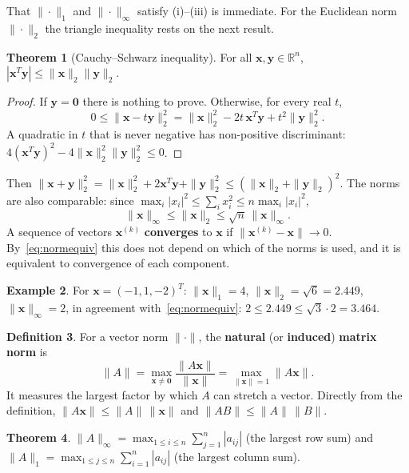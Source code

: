 \documentclass[11pt,a4paper]{article}
\numberwithin{equation}{section}
\theoremstyle{definition}
\newtheorem{thm}{Theorem}[subsection]
\newtheorem{defn}[thm]{Definition}
\newtheorem{exa}[thm]{Example}
\begin{document}
That $\|\cdot\|_1$ and $\|\cdot\|_\infty$ satisfy (i)--(iii) is immediate. For the Euclidean norm $\|\cdot\|_2$ the triangle inequality rests on the
next result.

\begin{thm}[Cauchy--Schwarz inequality]
\label{thm:cs}
For all $\mathbf x,\mathbf y\in\mathbb R^n$, $|\mathbf x^T\mathbf y|\leq\|\mathbf x\|_2\|\mathbf y\|_2$.
\end{thm}

\begin{proof}
If $\mathbf y = \mathbf 0$ there is nothing to prove. Otherwise, for every real $t$,
$$0\leq\|\mathbf x-t\mathbf y\|_2^2 = \|\mathbf x\|_2^2-2t\,\mathbf x^T\mathbf y+t^2\|\mathbf y\|_2^2 .$$
A quadratic in $t$ that is never negative has non-positive discriminant: $4(\mathbf x^T\mathbf y)^2-4\|\mathbf x\|_2^2\|\mathbf y\|_2^2\leq0$.
\end{proof}

Then $\|\mathbf x+\mathbf y\|_2^2 = \|\mathbf x\|_2^2+2\mathbf x^T\mathbf y+\|\mathbf y\|_2^2\leq(\|\mathbf x\|_2+\|\mathbf y\|_2)^2$. The norms are
also comparable: since $\max_i|x_i|^2\leq\sum_ix_i^2\leq n\max_i|x_i|^2$,
\begin{equation}\label{eq:normequiv}
\|\mathbf x\|_\infty\leq\|\mathbf x\|_2\leq\sqrt n\,\|\mathbf x\|_\infty .
\end{equation}
A sequence of vectors $\mathbf x^{(k)}$ \textbf{converges} to $\mathbf x$ if $\|\mathbf x^{(k)}-\mathbf x\|\longrightarrow0$. By~\eqref{eq:normequiv} this does
not depend on which of the norms is used, and it is equivalent to convergence of each component.

\begin{exa}
For $\mathbf x = (-1,1,-2)^T$: $\|\mathbf x\|_1 = 4$, $\|\mathbf x\|_2 = \sqrt6 = 2.449$, $\|\mathbf x\|_\infty = 2$, in agreement
with~\eqref{eq:normequiv}: $2\leq2.449\leq\sqrt3\cdot2 = 3.464$.
\end{exa}

\begin{defn}
For a vector norm $\|\cdot\|$, the \textbf{natural} (or \textbf{induced}) \textbf{matrix norm} is
$$\|A\| = \max_{\mathbf x\neq\mathbf 0}\frac{\|A\mathbf x\|}{\|\mathbf x\|} = \max_{\|\mathbf x\| = 1}\|A\mathbf x\| .$$
It measures the largest factor by which $A$ can stretch a vector. Directly from the definition, $\|A\mathbf x\|\leq\|A\|\,\|\mathbf x\|$ and
$\|AB\|\leq\|A\|\,\|B\|$.
\end{defn}

\begin{thm}
\label{thm:infnorm}
$\displaystyle\|A\|_\infty = \max_{1\leq i\leq n}\sum_{j=1}^n|a_{ij}|$ (the largest row sum) and $\displaystyle\|A\|_1 = \max_{1\leq j\leq n}\sum_{i=1}^n|a_{ij}|$ (the
largest column sum).
\end{thm}
\end{document}

